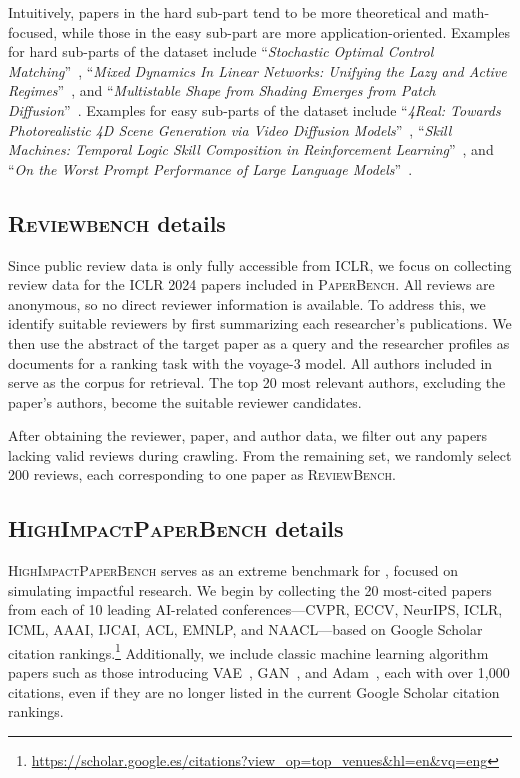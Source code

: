 Intuitively, papers in the hard sub-part tend to be more theoretical and math-focused, while those in the easy sub-part are more application-oriented. Examples for hard sub-parts of the dataset include ``\textit{Stochastic Optimal Control Matching}''~\citep{domingo2023stochastic}, ``\textit{Mixed Dynamics In Linear Networks: Unifying the Lazy and Active Regimes}''~\citep{tu2024mixed}, and ``\textit{Multistable Shape from Shading Emerges from Patch Diffusion}''~\citep{han2024multistable}. Examples for easy sub-parts of the dataset include ``\textit{4Real: Towards Photorealistic 4D Scene Generation via Video Diffusion Models}''~\citep{yu20244real}, ``\textit{Skill Machines: Temporal Logic Skill Composition in Reinforcement Learning}''~\citep{tasseskill}, and ``\textit{On the Worst Prompt Performance of Large Language Models}''~\citep{cao2024worst}.


\subsection{\textsc{Reviewbench} details}
Since public review data is only fully accessible from ICLR, we focus on collecting review data for the ICLR 2024 papers included in \textsc{PaperBench}. All reviews are anonymous, so no direct reviewer information is available. To address this, we identify suitable reviewers by first summarizing each researcher’s publications. We then use the abstract of the target paper as a query and the researcher profiles as documents for a ranking task with the voyage-3 model. All authors included in \benchname serve as the corpus for retrieval. The top 20 most relevant authors, excluding the paper’s authors, become the suitable reviewer candidates.

After obtaining the reviewer, paper, and author data, we filter out any papers lacking valid reviews during crawling. From the remaining set, we randomly select 200 reviews, each corresponding to one paper as \textsc{ReviewBench}.


\subsection{\textsc{HighImpactPaperBench} details}

\textsc{HighImpactPaperBench} serves as an extreme benchmark for \envname, focused on simulating impactful research. We begin by collecting the 20 most-cited papers from each of 10 leading AI-related conferences—CVPR, ECCV, NeurIPS, ICLR, ICML, AAAI, IJCAI, ACL, EMNLP, and NAACL—based on Google Scholar citation rankings.\footnote{\url{https://scholar.google.es/citations?view_op=top_venues&hl=en&vq=eng}} Additionally, we include classic machine learning algorithm papers such as those introducing VAE~\citep{kingma2013auto}, GAN~\citep{goodfellow2014generative}, and Adam~\citep{kingma2014adam}, each with over 1,000 citations, even if they are no longer listed in the current Google Scholar citation rankings.

